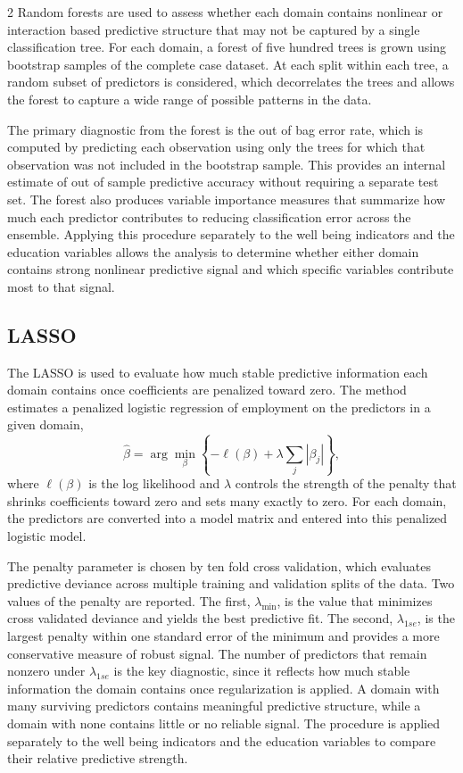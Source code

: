 \documentclass[
  11pt,
]{article}
\begin{document}
\begin{multicols}{2}
Random forests are used to assess whether each domain contains nonlinear or interaction based predictive structure that may not be captured by a single classification tree. For each domain, a forest of five hundred trees is grown using bootstrap samples of the complete case dataset. At each split within each tree, a random subset of predictors is considered, which decorrelates the trees and allows the forest to capture a wide range of possible patterns in the data. 

The primary diagnostic from the forest is the out of bag error rate, which is computed by predicting each observation using only the trees for which that observation was not included in the bootstrap sample. This provides an internal estimate of out of sample predictive accuracy without requiring a separate test set. The forest also produces variable importance measures that summarize how much each predictor contributes to reducing classification error across the ensemble. Applying this procedure separately to the well being indicators and the education variables allows the analysis to determine whether either domain contains strong nonlinear predictive signal and which specific variables contribute most to that signal.


\subsection{LASSO}

The LASSO is used to evaluate how much stable predictive information each domain contains once coefficients are penalized toward zero. The method estimates a penalized logistic regression of employment on the predictors in a given domain,
\begin{equation}
\hat\beta = \arg\min_{\beta}\left\{-\ell(\beta) + \lambda \sum_{j} |\beta_j|\right\},
\end{equation}
where $\ell(\beta)$ is the log likelihood and $\lambda$ controls the strength of the penalty that shrinks coefficients toward zero and sets many exactly to zero. For each domain, the predictors are converted into a model matrix and entered into this penalized logistic model.

The penalty parameter is chosen by ten fold cross validation, which evaluates predictive deviance across multiple training and validation splits of the data. Two values of the penalty are reported. The first, $\lambda_{\min}$, is the value that minimizes cross validated deviance and yields the best predictive fit. The second, $\lambda_{1se}$, is the largest penalty within one standard error of the minimum and provides a more conservative measure of robust signal. The number of predictors that remain nonzero under $\lambda_{1se}$ is the key diagnostic, since it reflects how much stable information the domain contains once regularization is applied. A domain with many surviving predictors contains meaningful predictive structure, while a domain with none contains little or no reliable signal. The procedure is applied separately to the well being indicators and the education variables to compare their relative predictive strength.


\end{multicols}
\end{document}
